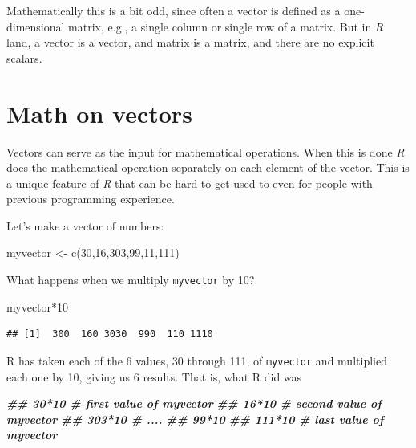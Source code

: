 \documentclass[
]{book}
\newenvironment{Shaded}{\begin{snugshade}}{\end{snugshade}}
\newcommand{\DecValTok}[1]{\textcolor[rgb]{0.00,0.00,0.81}{#1}}
\newcommand{\DocumentationTok}[1]{\textcolor[rgb]{0.56,0.35,0.01}{\textbf{\textit{#1}}}}
\newcommand{\FunctionTok}[1]{\textcolor[rgb]{0.00,0.00,0.00}{#1}}
\newcommand{\NormalTok}[1]{#1}
\newcommand{\OtherTok}[1]{\textcolor[rgb]{0.56,0.35,0.01}{#1}}
\newcommand{\SpecialCharTok}[1]{\textcolor[rgb]{0.00,0.00,0.00}{#1}}
\begin{document}
Mathematically this is a bit odd, since often a vector is defined as a one-dimensional matrix, e.g., a single column or single row of a matrix. But in \emph{R} land, a vector is a vector, and matrix is a matrix, and there are no explicit scalars.

\hypertarget{math-on-vectors}{%
\section{Math on vectors}\label{math-on-vectors}}

Vectors can serve as the input for mathematical operations. When this is done \emph{R} does the mathematical operation separately on each element of the vector. This is a unique feature of \emph{R} that can be hard to get used to even for people with previous programming experience.

Let's make a vector of numbers:

\begin{Shaded}
\begin{Highlighting}[]
\NormalTok{myvector }\OtherTok{\textless{}{-}} \FunctionTok{c}\NormalTok{(}\DecValTok{30}\NormalTok{,}\DecValTok{16}\NormalTok{,}\DecValTok{303}\NormalTok{,}\DecValTok{99}\NormalTok{,}\DecValTok{11}\NormalTok{,}\DecValTok{111}\NormalTok{)}
\end{Highlighting}
\end{Shaded}

What happens when we multiply \texttt{myvector} by 10?

\begin{Shaded}
\begin{Highlighting}[]
\NormalTok{myvector}\SpecialCharTok{*}\DecValTok{10}
\end{Highlighting}
\end{Shaded}

\begin{verbatim}
## [1]  300  160 3030  990  110 1110
\end{verbatim}

R has taken each of the 6 values, 30 through 111, of \texttt{myvector} and multiplied each one by 10, giving us 6 results. That is, what R did was

\begin{Shaded}
\begin{Highlighting}[]
\DocumentationTok{\#\# 30*10    \# first value of myvector}
\DocumentationTok{\#\# 16*10    \# second value of myvector}
\DocumentationTok{\#\# 303*10   \# ....}
\DocumentationTok{\#\# 99*10}
\DocumentationTok{\#\# 111*10   \# last value of myvector}
\end{Highlighting}
\end{Shaded}
\end{document}

